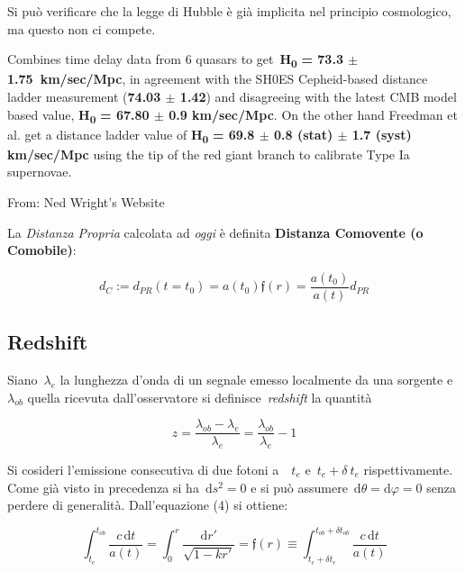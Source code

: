 Si può verificare che la legge di Hubble è già implicita nel principio
cosmologico, ma questo non ci compete.


\begin{definition}[Wong et al., 2019]
Combines time delay data from 6 
quasars to get~\textbf{H}\textsubscript{\textbf{0}} \textbf{= 73.3 $\pm$
1.75{~}km/sec/Mpc}, in agreement with the SH0ES Cepheid-based distance
ladder measurement (\textbf{74.03 $\pm$ 1.42}) and disagreeing with the
latest CMB model based value, \textbf{H}\textsubscript{\textbf{0}}
\textbf{= 67.80 $\pm$ 0.9 km/sec/Mpc}. On the other hand Freedman et al. get
a distance ladder value of \textbf{H}\textsubscript{\textbf{0}}
\textbf{= 69.8 $\pm$ 0.8 (stat) $\pm$ 1.7 (syst) km/sec/Mpc} using the tip of
the red giant branch to calibrate Type Ia supernovae.
\vspace*{0.5em}

From: Ned Wright's Website
\end{definition}

La \emph{Distanza Propria} calcolata ad \emph{oggi} è definita
\textbf{Distanza Comovente (o Comobile)}:

\begin{equation}
d_{C}:=d_{PR}(t=t_0)=a(t_0)\mathfrak{f}(r)=\frac{a(t_0)}{a(t)}d_{PR}
\end{equation}

\subsection{Redshift}

Siano~\(\lambda_e\) la lunghezza d'onda di un segnale emesso
localmente da una sorgente e~\(\lambda_{ob}\) quella ricevuta
dall'osservatore si definisce~\emph{redshift} la quantità

\begin{equation}
z=\frac{\lambda_{ob}-\lambda_e}{\lambda_e}=\frac{\lambda_{ob}}{\lambda_e}-1
\end{equation}

Si cosideri l'emissione consecutiva di due fotoni a~~\(t_e\)
e~\(t_e+\delta\ t_e\) rispettivamente. Come già visto in precedenza si
ha~\(\mathrm{d}s^2=0\) e si può assumere~\(\mathrm{d}\theta=\mathrm{d}\varphi=0\) senza perdere
di generalità. Dall'equazione (4) si ottiene:

\begin{equation}
\int_{t_{e}}^{t_{ob}}\frac{c\,\mathrm{d}t}{a(t)}=\int_{0}^{r}\frac{\mathrm{d}r'}{\sqrt{1-kr'}}=\mathfrak{f}(r)\equiv \int_{t_{e}+\delta t_e}^{t_{ob}+\delta t_{ob}}\frac{c\,\mathrm{d}t}{a(t)}
\end{equation}

